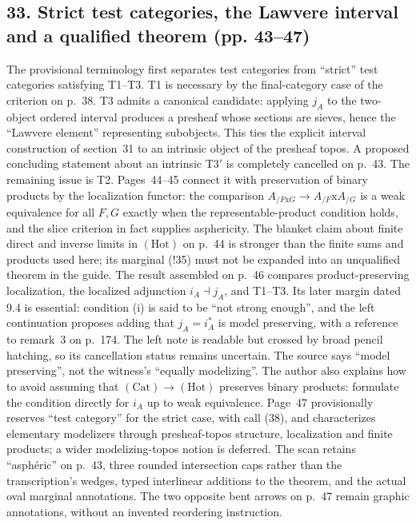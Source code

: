 \subsection*{33. Strict test categories, the Lawvere interval and a qualified theorem (pp. 43--47)}
The provisional terminology first separates test categories from ``strict'' test categories satisfying T1--T3. T1 is necessary by the final-category case of the criterion on p.~38. T3 admits a canonical candidate: applying $j_A$ to the two-object ordered interval produces a presheaf whose sections are sieves, hence the ``Lawvere element'' representing subobjects. This ties the explicit interval construction of section~31 to an intrinsic object of the presheaf topos. A proposed concluding statement about an intrinsic T3$'$ is completely cancelled on p.~43. The remaining issue is T2. Pages~44--45 connect it with preservation of binary products by the localization functor: the comparison $A_{/F\mathrm{x}G}\to A_{/F}\mathrm{x}A_{/G}$ is a weak equivalence for all $F,G$ exactly when the representable-product condition holds, and the slice criterion in fact supplies asphericity. The blanket claim about finite direct and inverse limits in $(\mathrm{Hot})$ on p.~44 is stronger than the finite sums and products used here; its marginal (!35) must not be expanded into an unqualified theorem in the guide. The result assembled on p.~46 compares product-preserving localization, the localized adjunction $i_A\dashv j_A$, and T1--T3. Its later margin dated 9.4 is essential: condition (i) is said to be ``not strong enough'', and the left continuation proposes adding that $j_A=i_A^*$ is model preserving, with a reference to remark~3 on p.~174. The left note is readable but crossed by broad pencil hatching, so its cancellation status remains uncertain. The source says ``model preserving'', not the witness's ``equally modelizing''. The author also explains how to avoid assuming that $(\mathrm{Cat})\to(\mathrm{Hot})$ preserves binary products: formulate the condition directly for $i_A$ up to weak equivalence. Page~47 provisionally reserves ``test category'' for the strict case, with call (38), and characterizes elementary modelizers through presheaf-topos structure, localization and finite products; a wider modelizing-topos notion is deferred. The scan retains ``asphéric'' on p.~43, three rounded intersection caps rather than the transcription's wedges, typed interlinear additions to the theorem, and the actual oval marginal annotations. The two opposite bent arrows on p.~47 remain graphic annotations, without an invented reordering instruction.

